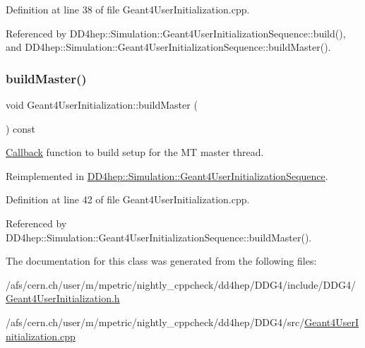 Definition at line 38 of file Geant4\+User\+Initialization.\+cpp.



Referenced by D\+D4hep\+::\+Simulation\+::\+Geant4\+User\+Initialization\+Sequence\+::build(), and D\+D4hep\+::\+Simulation\+::\+Geant4\+User\+Initialization\+Sequence\+::build\+Master().

\hypertarget{class_d_d4hep_1_1_simulation_1_1_geant4_user_initialization_acb13e9e0c314465bcf7680fc9d205b6b}{}\label{class_d_d4hep_1_1_simulation_1_1_geant4_user_initialization_acb13e9e0c314465bcf7680fc9d205b6b} 
\subsubsection{\texorpdfstring{build\+Master()}{buildMaster()}}
{\footnotesize\ttfamily void Geant4\+User\+Initialization\+::build\+Master (\begin{DoxyParamCaption}{ }\end{DoxyParamCaption}) const\hspace{0.3cm}{\ttfamily [virtual]}}



\hyperlink{class_d_d4hep_1_1_callback}{Callback} function to build setup for the MT master thread. 



Reimplemented in \hyperlink{class_d_d4hep_1_1_simulation_1_1_geant4_user_initialization_sequence_a7bcc884bce6a20d73e734777c0c75322}{D\+D4hep\+::\+Simulation\+::\+Geant4\+User\+Initialization\+Sequence}.



Definition at line 42 of file Geant4\+User\+Initialization.\+cpp.



Referenced by D\+D4hep\+::\+Simulation\+::\+Geant4\+User\+Initialization\+Sequence\+::build\+Master().



The documentation for this class was generated from the following files\+:\begin{DoxyCompactItemize}
\item 
/afs/cern.\+ch/user/m/mpetric/nightly\+\_\+cppcheck/dd4hep/\+D\+D\+G4/include/\+D\+D\+G4/\hyperlink{_geant4_user_initialization_8h}{Geant4\+User\+Initialization.\+h}\item 
/afs/cern.\+ch/user/m/mpetric/nightly\+\_\+cppcheck/dd4hep/\+D\+D\+G4/src/\hyperlink{_geant4_user_initialization_8cpp}{Geant4\+User\+Initialization.\+cpp}\end{DoxyCompactItemize}
